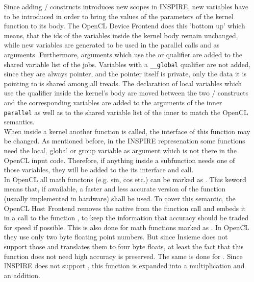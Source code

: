 Since adding / constructs introduces new scopes in INSPIRE, new variables have to be introduced in order to bring the values of the parameters of the kernel function to its body. The OpenCL Device Frontend does this 'bottom up' which means, that the ids of the variables inside the kernel body remain unchanged, while new variables are generated to be used in the parallel calls and as arguments. Furthermore, arguments which use the  or  qualifier are added to the shared variable list of the jobs. Variables with a \texttt{\_\_global} qualifier are not added, since they are always pointer, and the pointer itself is private, only the data it is pointing to is shared among all treads. The declaration of local variables which use the  qualifier inside the kernel's body are moved between the two / constructs and the corresponding variables are added to the arguments of the inner \texttt{parallel} as well as to the shared variable list of the inner  to match the OpenCL semantics. \\

When inside a kernel another function is called, the interface of this function may be changed. As mentioned before, in the INSPIRE represenation some functions need the local, global or group variable as argument which is not there in the OpenCL input code. Therefore, if anything inside a subfunction needs one of those variables, they will be added to the its interface and call. \\

In OpenCL all math functons (e.g. sin, cos etc.) can be marked as . This keword means that, if awailable, a faster and less accurate version of the function (usually implemented in hardware) shall be used. To cover this semantic, the OpenCL Host Frontend removes the native from the function call and embeds it in a call to the function , to keep the information that accuracy should be traded for speed if possible. This is also done for math functions marked as . In OpenCL they use only two byte floating point numbers. But since Insieme does not support those and translates them to four byte floats, at least the fact that this function does not need high accuracy is preserved. The same is done for . Since INSPIRE does not support , this function is expanded into a multiplication and an addition. \\

